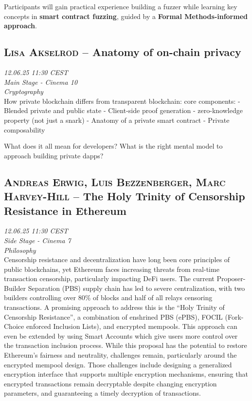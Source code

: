 Participants will gain practical experience building a fuzzer while learning key concepts in \textbf{smart contract fuzzing}, guided by a \textbf{Formal Methods-informed approach}.

\clearpage
\subsection {\textsc{Lisa Akselrod}  -- Anatomy of on-chain privacy} \noindent \textit {12.06.25 11:30 CEST\\ Main Stage - Cinema 10\\ Cryptography}\\[1em] How private blockchain differs from transparent blockchain: core components:
- Blended private and public state
- Client-side proof generation
- zero-knowledge property (not just a snark)
- Anatomy of a private smart contract
- Private composability

What does it all mean for developers? What is the right mental model to approach building private dapps?

\clearpage
\subsection {\textsc{Andreas Erwig, Luis Bezzenberger, Marc Harvey-Hill}  -- The Holy Trinity of Censorship Resistance in Ethereum} \noindent \textit {12.06.25 11:30 CEST\\ Side Stage - Cinema 7\\ Philosophy}\\[1em] Censorship resistance and decentralization have long been core principles of public blockchains, yet Ethereum faces increasing threats from real-time transaction censorship, particularly impacting DeFi users. The current Proposer-Builder Separation (PBS) supply chain has led to severe centralization, with two builders controlling over 80\% of blocks and half of all relays censoring transactions. A promising approach to address this is the ``Holy Trinity of Censorship Resistance'', a combination of enshrined PBS (ePBS), FOCIL (Fork-Choice enforced Inclusion Lists), and encrypted mempools. This approach can even be extended by using Smart Accounts which give users more control over the transaction inclusion process. While this proposal has the potential to restore Ethereum’s fairness and neutrality, challenges remain, particularly around the encrypted mempool design. Those challenges include designing a generalized encryption interface that supports multiple encryption mechanisms, ensuring that encrypted transactions remain decryptable despite changing encryption parameters, and guaranteeing a timely decryption of transactions.

